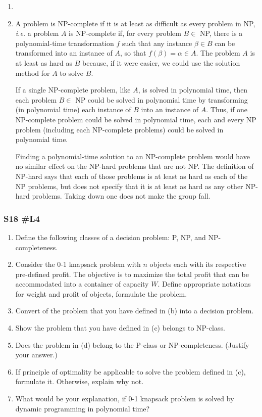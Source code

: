 \begin{enumerate}[label=\alph*.]
	
	
	\item
	
	\item A problem is NP-complete if it is at least as difficult as every problem in NP, {\it i.e.} a problem $A$ is NP-complete if, for every problem $B \in$ NP, there is a polynomial-time transformation $f$ such that any instance $\beta \in B$ can be transformed into an instance of $A$, so that $f(\beta) = \alpha \in A$.  The problem $A$ is at least as hard as $B$ because, if it were easier, we could use the solution method for $A$ to solve $B$.  
	
	 If a single NP-complete problem, like $A$, is solved in polynomial time, then each problem $B \in $ NP could be solved in polynomial time by transforming (in polynomial time) each instance of $B$ into an instance of $A$.  Thus, if one NP-complete problem could be solved in polynomial time, each and every NP problem (including each NP-complete problems) could be solved in polynomial time.  
	 
	 Finding a polynomial-time solution to an NP-complete problem would have no similar effect on the NP-hard problems that are not NP.  The definition of NP-hard says that each of those problems is at least as hard as each of the NP problems, but does not specify that it is at least as hard as any other NP-hard problems.  Taking down one does not make the group fall.  
	
\end{enumerate}

\subsubsection{	S18 \#L4}
\begin{enumerate}[label=\alph*.]
		\item Define the following classes of a decision problem:  P, NP, and NP-completeness.
		\item Consider the 0-1 knapsack problem with $n$ objects each with its respective pre-defined profit.  The objective is to maximize the total profit that can be accommodated into a container of capacity $W$.  Define appropriate notations for weight and profit of objects, formulate the problem.
		\item Convert of the problem that you have defined in (b) into a decision problem.
		\item Show the problem that you have defined in (c) belongs to NP-class.
		\item Does the problem in (d) belong to the P-class or NP-completeness. (Justify your answer.)
		\item If principle of optimality be applicable to solve the problem defined in (c), formulate it.  Otherwise, explain why not.  
		\item What would be your explanation, if 0-1 knapsack problem is solved by dynamic programming in polynomial time?
\end{enumerate}

